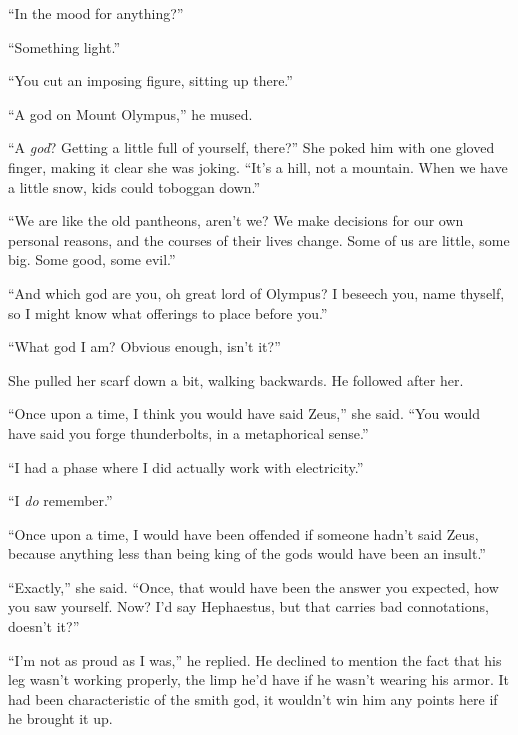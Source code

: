 ``In the mood for anything?''



``Something light.''



``You cut an imposing figure, sitting up there.''



``A god on Mount Olympus,'' he mused.



``A \emph{god}?  Getting a little full of yourself, there?''  She poked him with one gloved finger, making it clear she was joking.  ``It's a hill, not a mountain.  When we have a little snow, kids could toboggan down.''



``We are like the old pantheons, aren't we?  We make decisions for our own personal reasons, and the courses of their lives change.  Some of us are little, some big.  Some good, some evil.''



``And which god are you, oh great lord of Olympus?  I beseech you, name thyself, so I might know what offerings to place before you.''



``What god I am?  Obvious enough, isn't it?''



She pulled her scarf down a bit, walking backwards.  He followed after her.



``Once upon a time, I think you would have said Zeus,'' she said.  ``You would have said you forge thunderbolts, in a metaphorical sense.''



``I had a phase where I did actually work with electricity.''



``I \emph{do} remember.''



``Once upon a time, I would have been offended if someone hadn't said Zeus, because anything less than being king of the gods would have been an insult.''



``Exactly,'' she said.  ``Once, that would have been the answer you expected, how you saw yourself.  Now?  I'd say Hephaestus, but that carries bad connotations, doesn't it?''



``I'm not as proud as I was,'' he replied.  He declined to mention the fact that his leg wasn't working properly, the limp he'd have if he wasn't wearing his armor.  It had been characteristic of the smith god, it wouldn't win him any points here if he brought it up.



